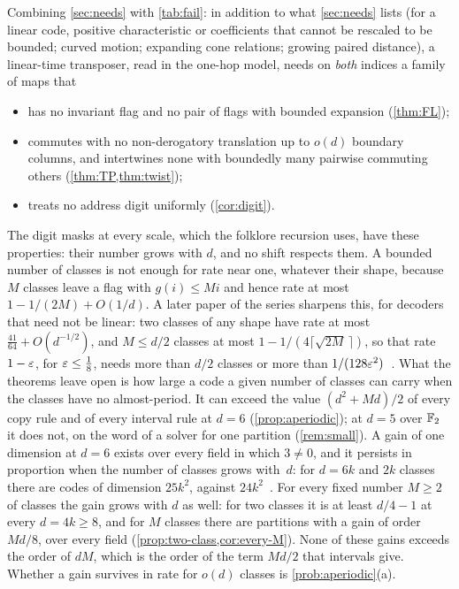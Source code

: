 Combining \cref{sec:needs} with \cref{tab:fail}: in addition to what \cref{sec:needs} lists (for a linear code,
positive characteristic or coefficients that cannot be rescaled to be bounded; curved motion; expanding cone relations;
growing paired distance), a linear-time transposer, read in the one-hop model, needs on \emph{both} indices a family of
maps that
\begin{itemize}[leftmargin=1.5em]
\item has no invariant flag and no pair of flags with bounded expansion (\cref{thm:FL});
\item commutes with no non-derogatory translation up to $o(d)$ boundary columns, and intertwines none with boundedly
many pairwise commuting others (\cref{thm:TP,thm:twist});
\item treats no address digit uniformly (\cref{cor:digit}).
\end{itemize}
The digit masks at every scale, which the folklore recursion uses, have these properties: their number grows with
$d$, and no shift respects them. A bounded number of classes is not enough for rate near one, whatever their shape,
because $M$ classes leave a flag with $g(i)\le Mi$ and hence rate at most $1-1/(2M)+O(1/d)$. A later paper of the
series sharpens this, for decoders that need not be linear: two classes of any shape have rate at most
$\tfrac{41}{64}+O(d^{-1/2})$, and $M\le d/2$ classes at most $1-1/(4\lceil\sqrt{2M}\,\rceil)$, so that rate
$1-\varepsilon$, for $\varepsilon\le\tfrac18$, needs more than $d/2$ classes or more than
$1/(128\varepsilon^2)$~\cite[Theorems~3.4 and~3.5]{SharedDecoders2026}. What the theorems leave
open is how large a code a given number of classes can carry when the classes have no almost-period. It can exceed the
value $(d^2+Md)/2$ of every copy rule and of every interval rule at $d=6$ (\cref{prop:aperiodic}); at $d=5$ over
$\mathbb{F}_2$ it does not, on the word of a solver for one partition (\cref{rem:small}). A gain of one dimension at $d=6$
exists over every field in which $3\ne0$, and it persists in proportion when the number of classes grows with~$d$: for
$d=6k$ and $2k$ classes there are codes of dimension $25k^2$, against
$24k^2$~\cite[Theorem~3.2 and Corollary~4.4]{ClassUniformMemo2026}. For every fixed number $M\ge2$ of classes the gain
grows with $d$ as well: for two classes it is at least $d/4-1$ at every $d=4k\ge8$, and for $M$ classes there are
partitions with a gain of order $Md/8$, over every field (\cref{prop:two-class,cor:every-M}). None of these gains
exceeds the order of $dM$, which is the order of the term $Md/2$ that intervals give. Whether a gain survives in rate for $o(d)$ classes is
\cref{prob:aperiodic}(a).

